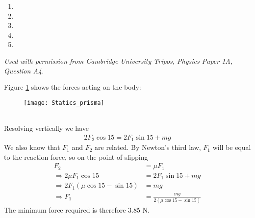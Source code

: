 \begin{problem} 
 {

\begin{enumerate}
\item {}\correct
\item {}
\item {}
\item {}
\item {}
\end{enumerate}
}
{\textit{Used with permission from Cambridge University Tripos, Physics Paper 1A, Question A4.}}
{
Figure \ref{fig:Statics_prisma} shows the forces acting on the body:
\begin{figure}[h]
\centering
\texttt{[image: Statics\_prisma]}
\caption{}
\label{fig:Statics_prisma}
\end{figure}
\\
Resolving vertically we have
\begin{align*}
2F_2\cos{15}=2F_1\sin{15}+mg
\end{align*}
We also know that $F_1$ and $F_2$ are related. By Newton's third law, $F_1$ will be equal to the reaction force, so on the point of slipping
\begin{align*}
F_2&=\mu F_1 \\
\Rightarrow 2\mu F_1\cos{15}&=2F_1\sin{15}+mg \\
\Rightarrow 2F_1\left(\mu\cos{15}-\sin{15}\right)&=mg \\
\Rightarrow F_1&=\frac{mg}{2\left(\mu\cos{15}-\sin{15}\right)}
\end{align*}
The minimum force required is therefore 3.85 N. 
}
\end{problem}